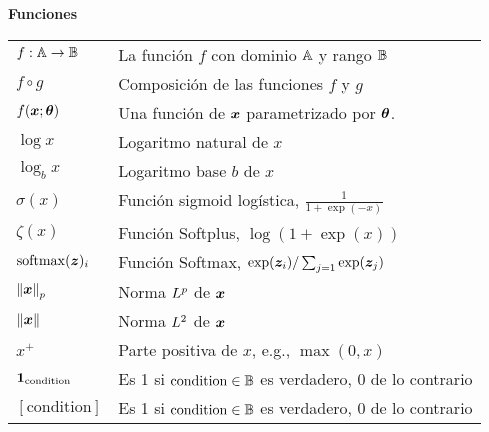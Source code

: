 \vspace{\notationgap}
\begin{minipage}{\textwidth}
\centerline{\bf Funciones}
\bgroup
\def\arraystretch{1.5}
\begin{tabular}{>{\centering}m{} p{}}
$\displaystyle f: {\mathbb{A}} \rightarrow {\mathbb{B}}$ & La función $f$ con dominio ${\mathbb{A}}$ y rango ${\mathbb{B}}$\\
$\displaystyle f \circ g $             & Composición de las funciones $f$ y $g$ \\
  $\displaystyle f({\bm{x}} ; {\bm{\theta}}) $    & Una función de ${\bm{x}}$ parametrizado por ${\bm{\theta}}$. \\
$\displaystyle \log x$                 & Logaritmo natural de $x$ \\
$\displaystyle \log_b x$               & Logaritmo base $b$ de $x$ \\
$\displaystyle \sigma(x)$              & Función sigmoid logística, $\displaystyle \frac{1} {1 + \exp(-x)}$ \\
$\displaystyle \zeta(x)$               & Función Softplus, $\log(1 + \exp(x))$ \\
$\displaystyle \mathrm{softmax}({\bm{z}})_i$                & Función Softmax, $\exp({\bm{z}}_i) / \sum_{j=1} \exp({\bm{z}}_j)$ \\
$\displaystyle \left\lVert{\bm{x}}\right\rVert_p $          & Norma $L^p$ de ${\bm{x}}$ \\
$\displaystyle \left\lVert{\bm{x}}\right\rVert $            & Norma $L^2$ de ${\bm{x}}$ \\
$\displaystyle x^+$                    & Parte positiva de $x$, e.g., $\max(0,x)$\\
$\displaystyle \bm{1}_\mathrm{condition}$  & Es 1 si $\mathrm{condition} \in {\mathbb{B}}$ es verdadero, 0 de lo contrario\\
$\displaystyle [\mathrm{condition}]$  & Es 1 si $\mathrm{condition} \in {\mathbb{B}}$ es verdadero, 0 de lo contrario\\
\end{tabular}
\egroup
{}
\end{minipage}



